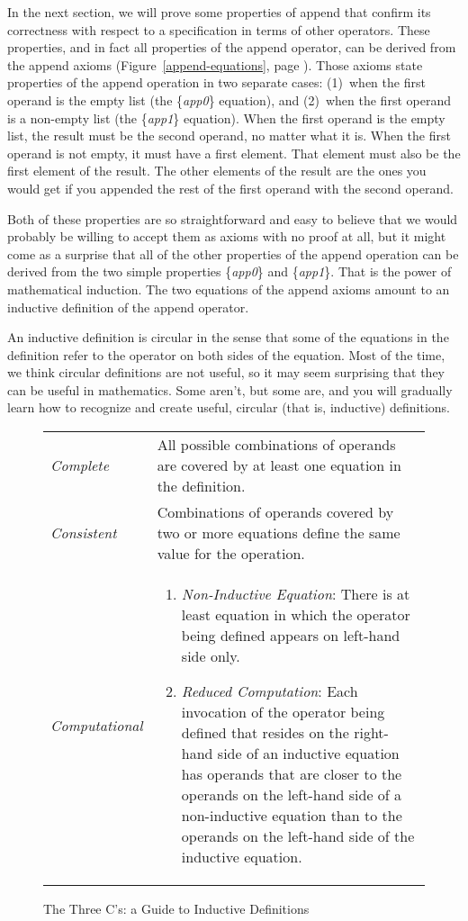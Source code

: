 In the next section, we will prove some properties of append
that confirm its correctness with respect to a specification in terms of other operators.
These properties, and in fact all properties of the append operator,
can be derived from the append axioms (Figure~\ref{append-equations}, page \pageref{append-equations}).
Those axioms state properties of the append operation in two separate cases:
(1)~when the first operand is the empty list (the \{\emph{app0}\} equation), and
(2)~when the first operand is a non-empty list (the \{\emph{app1}\} equation).
When the first operand is the empty list,
the result must be the second operand, no matter what it is.
When the first operand is not empty, it must have a first element.
That element must also be the first element of the result.
The other elements of the result are the ones you would get
if you appended the rest of the first operand with the second operand.

Both of these properties are so straightforward and easy to believe
that we would probably be willing to accept them as axioms with no proof at all,
but it might come as a surprise that all of the other properties
of the append operation can be derived from
the two simple properties \{\emph{app0}\} and \{\emph{app1}\}.
That is the power of mathematical induction.
The two equations of the append axioms
amount to an inductive definition of the append operator.

An inductive definition is circular in the sense
that some of the equations in the definition refer
to the operator on both sides of the equation.
Most of the time, we think circular definitions are not useful,
so it may seem surprising that they can be useful in mathematics.
Some aren't, but some are, and you will
gradually learn how to recognize and create useful,
circular (that is, inductive) definitions.

\begin{figure}
\begin{center}
\begin{tabular}{lp{3.5in}}
\emph{Complete} & All possible combinations of operands are covered by at least one equation in the definition. \\
\emph{Consistent} & Combinations of operands covered by two or more equations define the same value for the operation. \\
\emph{Computational} &
\begin{enumerate}
\item \emph{Non-Inductive Equation}: There is at least equation in which
the operator being defined appears on left-hand side only.
\item \emph{Reduced Computation}: Each invocation of the operator being defined that resides on
            the right-hand side of an inductive equation has operands that
            are closer to the operands on the left-hand side of a non-inductive equation than to
            the operands on the left-hand side of the inductive equation.
\end{enumerate}
\end{tabular}
\end{center}
\caption{The Three C's: a Guide to Inductive Definitions}
\label{fig:inductive-def-keys}
\end{figure}


